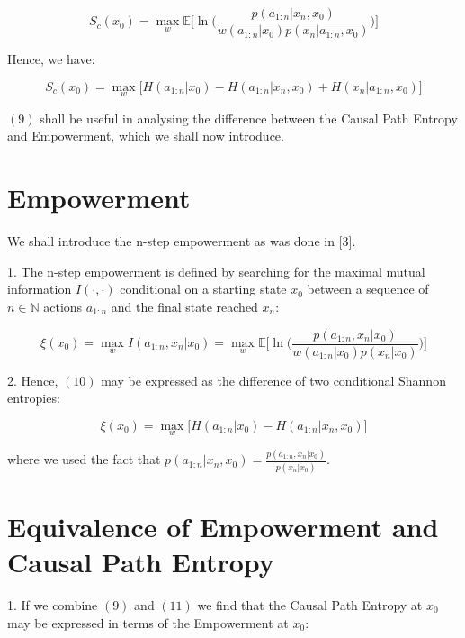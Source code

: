 \documentclass{article}
\begin{document}
\begin{equation}
S_c(x_0) = \max\limits_{w} \mathbb{E} \big[ \ln \big( \frac{p(a_{1:n}|x_n,x_0)}{w(a_{1:n}|x_0)p(x_n|a_{1:n},x_0)}\big)\big]
\end{equation}

Hence, we have:

\begin{equation}
S_c(x_0) = \max\limits_{w} \big[H(a_{1:n}|x_0)-H(a_{1:n}|x_n,x_0) +H(x_n|a_{1:n},x_0)\big]
\end{equation}

$(9)$ shall be useful in analysing the difference between the Causal Path Entropy and Empowerment, which we shall now introduce.  



\section{Empowerment}

We shall introduce the n-step empowerment as was done in [3]. 

1. The n-step empowerment is defined by searching for the maximal mutual information $I(\cdot,\cdot)$ conditional on a starting state $x_0$ between a sequence of $n \in \mathbb{N}$ actions $a_{1:n}$ and the final state reached $x_n$:

\begin{equation}
\xi(x_0) = \max\limits_{w} I(a_{1:n},x_n|x_0)=\max\limits_{w} \mathbb{E}  \big[ \ln \big( \frac{p(a_{1:n},x_n|x_0)}{w(a_{1:n}|x_0)p(x_n|x_0)}\big)\big]
\end{equation}

2. Hence, $(10)$ may be expressed as the difference of two conditional Shannon entropies:

\begin{equation}
\xi(x_0) = \max\limits_{w} \big[H(a_{1:n}|x_0)-H(a_{1:n}|x_n,x_0) \big]
\end{equation}

where we used the fact that $p(a_{1:n}|x_n,x_0)=\frac{p(a_{1:n},x_n|x_0)}{p(x_n|x_0)}$.

\newpage

\section{Equivalence of Empowerment and Causal Path Entropy}

1. If we combine $(9)$ and $(11)$ we find that the Causal Path Entropy at $x_0$ may be expressed in terms of the Empowerment at $x_0$:
\end{document}
